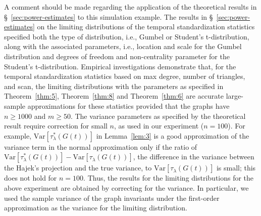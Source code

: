\documentclass[10pt,draftclsnofoot,onecolumn]{IEEEtran}
\theoremstyle{definition}
\begin{document}
A comment should be made regarding the application of the
theoretical results in \S~\ref{sec:power-estimates} to this simulation
example. The results in \S~\ref{sec:power-estimates} on the limiting
distributions of the temporal standardization statistics specified both
the type of distribution, i.e., Gumbel or Student's t-distribution,
along with the associated parameters, i.e., location and scale for the Gumbel
distribution and degrees of freedom and non-centrality parameter for
the Student's t-distribution. 
Empirical investigations demonstrate that, for the temporal standardization
statistics based on max degree, number of triangles, and scan, the limiting distributions
with the parameters as specified in Theorem~\ref{thm:5},
Theorem~\ref{thm:8} and Theorem~\ref{thm:6} are accurate large-sample
approximations for these statistics provided that the graphs have $n \geq 1000$ and $m \geq 50$.
The variance parameters as specified by the theoretical result
require correction for small $n$, as used in our experiment ($n = 100$).
For example, $\mathrm{Var}[\tau_{\lambda}^{*}(G(t))]$ in Lemma~\ref{lem:3} is a
good approximation of the variance term in the normal approximation
only if the ratio of $\mathrm{Var}[\tau_{\lambda}^{*}(G(t))] -
\mathrm{Var}[\tau_{\lambda}(G(t))]$, the difference in the variance
between the Hajek's projection and the true variance, to
$\mathrm{Var}[\tau_{\lambda}(G(t))]$ is small; this does not hold
for $n = 100$. Thus, the results for the limiting distributions for the above experiment are obtained by
correcting for the variance. In particular, we used the sample variance of the
graph invariants under the first-order approximation as the variance
for the limiting distribution. 
\end{document}
